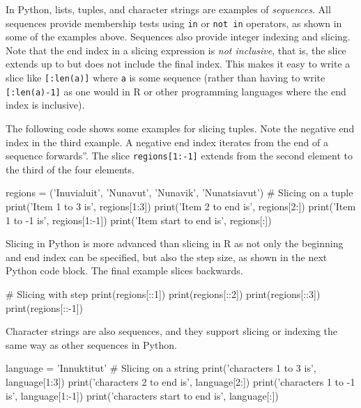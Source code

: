 In Python, lists, tuples, and character strings are examples of \emph{sequences}. All sequences provide membership tests using \texttt{in} or \texttt{not in} operators, as shown in some of the examples above. Sequences also provide integer indexing and slicing.  Note that the end index in a slicing expression is \emph{not inclusive}, that is, the slice extends up to but does not include the final index. This makes it easy to write a slice like \texttt{[:len(a)]} where \texttt{a} is some sequence (rather than having to write \texttt{[:len(a)-1]} as one would in R or other programming languages where the end index is inclusive).

The following code shows some examples for slicing tuples. Note the negative end index in the third example. A negative end index iterates from the end of a sequence forwards''. The slice \texttt{regions[1:-1]} extends from the second element to the third of the four elements. 

\begin{samepage}
\begin{pythoncode}
regions = ('Inuvialuit', 'Nunavut', 
           'Nunavik', 'Nunatsiavut')
# Slicing on a tuple
print('Item 1 to 3 is', regions[1:3])
print('Item 2 to end is', regions[2:])
print('Item 1 to -1 is', regions[1:-1])
print('Item start to end is', regions[:])
\end{pythoncode}
\end{samepage}

Slicing in Python is more advanced than slicing in R as not only the beginning and end index can be specified, but also the step size, as shown in the next Python code block. The final example slices backwards.

\begin{samepage}
\begin{pythoncode}
# Slicing with step
print(regions[::1])
print(regions[::2])
print(regions[::3])
print(regions[::-1])
\end{pythoncode}
\end{samepage}

Character strings are also sequences, and they support slicing or indexing the same way as other sequences in Python.

\begin{samepage}
\begin{pythoncode}
language = 'Innuktitut'
# Slicing on a string 
print('characters 1 to 3 is', language[1:3])
print('characters 2 to end is', language[2:])
print('characters 1 to -1 is', language[1:-1])
print('characters start to end is', language[:])
\end{pythoncode}
\end{samepage}


